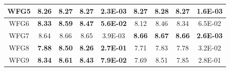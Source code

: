 \begin{table}[t]
\begin{center}
\begin{scriptsize}
\begin{tabular}{ccccccccc}
\multicolumn{1}{|c|}{WFG5} & \multicolumn{1}{c|}{8.26}           & \multicolumn{1}{c|}{8.27}           & \multicolumn{1}{c|}{8.27}           & \multicolumn{1}{c|}{2.3E-03}          & \multicolumn{1}{c|}{8.27}           & \multicolumn{1}{c|}{8.28}           & \multicolumn{1}{c|}{8.27}           & \multicolumn{1}{c|}{1.6E-03}          \\ \hline
\multicolumn{1}{|c|}{WFG6} & \multicolumn{1}{c|}{\textbf{8.33}}  & \multicolumn{1}{c|}{\textbf{8.59}}  & \multicolumn{1}{c|}{\textbf{8.47}}  & \multicolumn{1}{c|}{\textbf{5.6E-02}} & \multicolumn{1}{c|}{8.12}           & \multicolumn{1}{c|}{8.46}           & \multicolumn{1}{c|}{8.34}           & \multicolumn{1}{c|}{6.5E-02}          \\ \hline
\multicolumn{1}{|c|}{WFG7} & \multicolumn{1}{c|}{8.64}           & \multicolumn{1}{c|}{8.66}           & \multicolumn{1}{c|}{8.65}           & \multicolumn{1}{c|}{3.9E-03}          & \multicolumn{1}{c|}{\textbf{8.66}}  & \multicolumn{1}{c|}{\textbf{8.67}}  & \multicolumn{1}{c|}{\textbf{8.66}}  & \multicolumn{1}{c|}{\textbf{2.6E-03}} \\ \hline
\multicolumn{1}{|c|}{WFG8} & \multicolumn{1}{c|}{\textbf{7.88}}  & \multicolumn{1}{c|}{\textbf{8.50}}  & \multicolumn{1}{c|}{\textbf{8.26}}  & \multicolumn{1}{c|}{\textbf{2.7E-01}} & \multicolumn{1}{c|}{7.71}           & \multicolumn{1}{c|}{7.83}           & \multicolumn{1}{c|}{7.78}           & \multicolumn{1}{c|}{3.2E-02}          \\ \hline
\multicolumn{1}{|c|}{WFG9} & \multicolumn{1}{c|}{\textbf{8.34}}  & \multicolumn{1}{c|}{\textbf{8.61}}  & \multicolumn{1}{c|}{\textbf{8.43}}  & \multicolumn{1}{c|}{\textbf{7.9E-02}} & \multicolumn{1}{c|}{7.69}           & \multicolumn{1}{c|}{8.51}           & \multicolumn{1}{c|}{7.85}           & \multicolumn{1}{c|}{2.8E-01}          \\ \hline


\end{tabular}
\end{scriptsize}
\end{center}
\end{table}
